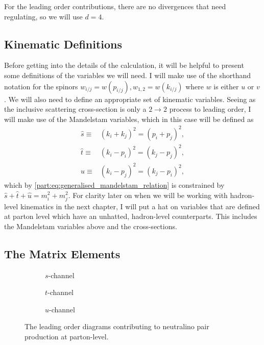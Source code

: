 \documentclass[../main.tex]{subfiles}
\begin{document}
For the leading order contributions, there are no divergences that need regulating, so we will use \(d=4\).

\subsection{Kinematic Definitions}
Before getting into the details of the calculation, it will be helpful to present some definitions of the variables we will need.
I will make use of the shorthand notation for the spinors \(w_{i/j} = w(p_{i/j}), w_{1,2} = w(k_{i/j})\) where \(w\) is either \(u\) or \(v\).
We will also need to define an appropriate set of kinematic variables.
Seeing as the inclusive scattering cross-section is only a \(2 \to 2\) process to leading order, I will make use of the Mandelstam variables, which in this case will be defined as
\begin{subequations}
  \begin{align}
    \hat{s} \equiv & (k_i+k_j)^2 = (p_i+p_j)^2, \\
    \hat{t} \equiv & (k_i-p_i)^2 = (k_j-p_j)^2, \\
    \hat{u} \equiv & (k_i-p_j)^2 = (k_j-p_i)^2,
  \end{align}
\end{subequations}
which by \cref{part:eq:generalised_mandelstam_relation} is constrained by \(\hat{s} + \hat{t} + \hat{u} = m_i^2 + m_j^2\).
For clarity later on when we will be working with hadron-level kinematics in the next chapter, I will put a hat on variables that are defined at parton level which have an unhatted, hadron-level counterparts.
This includes the Mandelstam variables above and the cross-sections.


\subsection{The Matrix Elements}
\begin{figure} [ht!]
  \centering
  \begin{subfigure}{0.3\linewidth}
    \centering
    \caption{\(s\)-channel}
  \end{subfigure}
  \begin{subfigure}{0.3\linewidth}
    \centering
    \caption{\(t\)-channel}
  \end{subfigure}
  \begin{subfigure}{0.3\linewidth}
    \centering
    \caption{\(u\)-channel}
  \end{subfigure}
  \caption{The leading order diagrams contributing to neutralino pair
    production at parton-level.}
  \label{pc:fig:tree_level_diagrams}
\end{figure}
\end{document}
